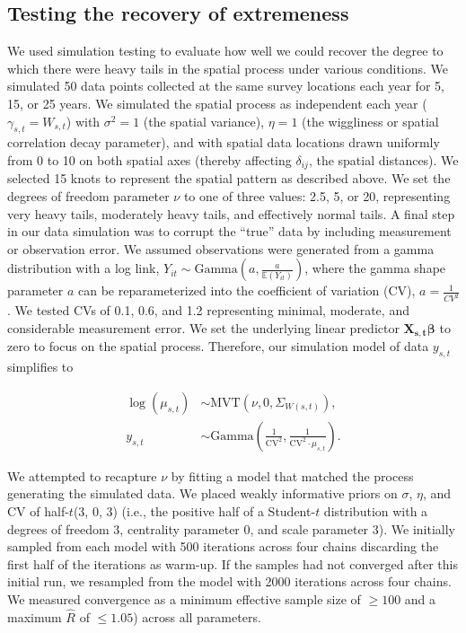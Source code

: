 \documentclass[12pt,english]{article}
\begin{document}
\begin{spacing}{1.3}
\subsection{Testing the recovery of extremeness}

We used simulation testing to evaluate how well we could recover the degree to
which there were heavy tails in the spatial process under various conditions.
We simulated 50 data points collected at the same survey locations each year
for 5, 15, or 25 years. We simulated the spatial process as independent each
year ($\gamma_{s,t} = W_{s,t}$) with $\sigma^2 = 1$ (the spatial variance),
$\eta = 1$ (the wiggliness or spatial correlation decay parameter), and
with spatial data locations drawn uniformly from 0 to 10 on both spatial axes
(thereby affecting $\delta_{ij}$, the spatial distances).
We selected 15 knots to represent the spatial pattern as described above.
We set the degrees of freedom parameter $\nu$ to
one of three values: 2.5, 5, or 20, representing very heavy tails, moderately heavy
tails, and effectively normal tails. A final step in our data
simulation was to corrupt the ``true'' data by including measurement or
observation error. We assumed observations were generated from a gamma
distribution with a log link, $Y_{it}\sim \mathrm{Gamma}\left(a,\frac
  {a}{\mathbb{E}(Y_{it})} \right)$, where the gamma shape parameter $a$ can be
reparameterized into the coefficient of variation (CV), $a=\frac{1}{CV^2}$. We
tested CVs of 0.1, 0.6, and 1.2 representing minimal, moderate, and
considerable measurement error. We set the underlying linear predictor
$\bm{X_{s,t}} \bm{\beta}$ to zero to focus on the spatial process. Therefore,
our simulation model of data $y_{s,t}$ simplifies to

\begin{align}
  \log(\mu_{s,t}) &\sim \mathrm{MVT}\left(\nu, 0, \Sigma_{W(s,t)}\right),\\
  y_{s,t} &\sim \mathrm{Gamma} \left( \frac{1}{\mathrm{CV}^2},
  \frac{1}{\mathrm{CV}^2 \cdot \mu_{s,t} } \right).
\end{align}

We attempted to recapture $\nu$ by fitting a model that matched the process
generating the simulated data. We placed weakly informative priors on $\sigma$,
$\eta$, and CV of half-$t$(3, 0, 3) (i.e., the positive half of a Student-$t$
distribution with a degrees of freedom 3, centrality parameter 0, and scale
parameter 3). We initially sampled from each model with 500 iterations across
four chains discarding the first half of the iterations as warm-up. If the
samples had not converged after this initial run, we resampled from the model
with 2000 iterations across four chains. We measured convergence as a minimum
effective sample size of $\ge 100$ and a maximum $\hat{R}$ of $\le 1.05$)
across all parameters.


\end{spacing}
\end{document}
